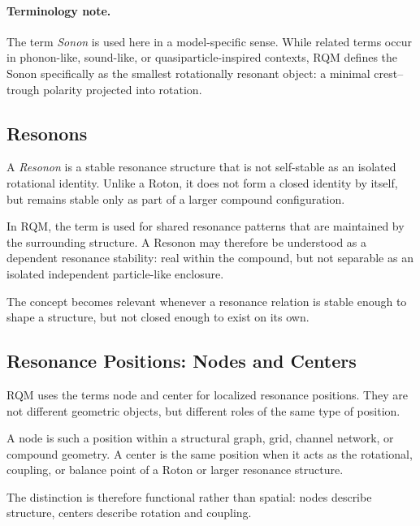 \documentclass[11pt,a4paper]{article}
\begin{document}
\paragraph{Terminology note.}
The term \emph{Sonon} is used here in a model-specific sense. While related terms occur in phonon-like, sound-like, or quasiparticle-inspired contexts, RQM defines the Sonon specifically as the smallest rotationally resonant object: a minimal crest–trough polarity projected into rotation.


\subsection{Resonons}

A \emph{Resonon} is a stable resonance structure that is not self-stable as an isolated rotational identity. Unlike a Roton, it does not form a closed identity by itself, but remains stable only as part of a larger compound configuration.

In RQM, the term is used for shared resonance patterns that are maintained by the surrounding structure. A Resonon may therefore be understood as a dependent resonance stability: real within the compound, but not separable as an isolated independent particle-like enclosure.

The concept becomes relevant whenever a resonance relation is stable enough to shape a structure, but not closed enough to exist on its own.


\subsection{Resonance Positions: Nodes and Centers}

RQM uses the terms node and center for localized resonance positions. They are not different geometric objects, but different roles of the same type of position.

A node is such a position within a structural graph, grid, channel network, or compound geometry. A center is the same position when it acts as the rotational, coupling, or balance point of a Roton or larger resonance structure.

The distinction is therefore functional rather than spatial: nodes describe structure, centers describe rotation and coupling.

\end{document}
